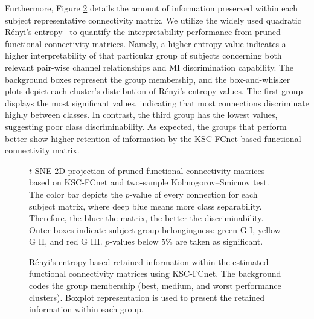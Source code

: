 Furthermore, Figure \ref{fig:renyipvalue} details the amount of information preserved within each subject representative connectivity matrix. We utilize the widely used quadratic Rényi's entropy~\cite{bromiley2004shannon} to quantify the interpretability performance from pruned functional connectivity matrices. Namely, a higher entropy value indicates a higher interpretability of that particular group of subjects concerning both relevant pair-wise channel relationships and MI discrimination capability. The background boxes represent the group membership, and the box-and-whisker plots depict each cluster's distribution of Rényi's entropy values. The first group displays the most significant values, indicating that most connections discriminate highly between classes. In contrast, the third group has the lowest values, suggesting poor class discriminability. As expected, the groups that perform better show higher retention of information by the KSC-FCnet-based functional connectivity matrix.


\begin{figure}[!h]
    \centering
    \resizebox{0.9\linewidth}{!}{}
    \caption{
        {{$t$-SNE 2D projection}
            of pruned functional connectivity matrices based on KSC-FCnet and two-sample Kolmogorov--Smirnov test. The color bar depicts the $p$-value of every connection for each subject matrix, where deep blue means more class separability. Therefore, the bluer the matrix, the better the discriminability. Outer boxes indicate subject group belongingness: green G I, yellow G II, and red G III.  $p$-values below $5\%$ are taken as significant.}
    }\label{fig:p-valuematrix}
\end{figure}


\begin{figure}[H]%
    \resizebox{0.90\linewidth}{!}{}
    \caption{Rényi's entropy-based retained information within the estimated functional connectivity matrices using KSC-FCnet. The background codes the group membership (best, medium, and worst performance clusters). Boxplot representation is used to present the retained information within each group.}\label{fig:renyipvalue}
\end{figure}


